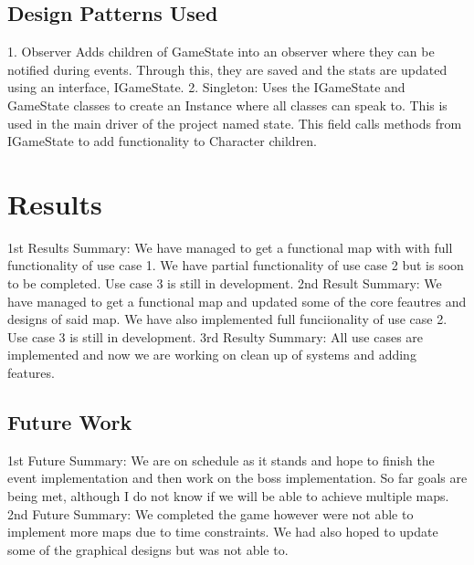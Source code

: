 \documentclass[10pt,conference,onecolumn,compsoc]{IEEEtran}
\begin{document}
\subsection{Design Patterns Used}
1. Observer Adds children of GameState into an observer where they can be notified during events. Through this, they are saved and the stats are updated using an interface, IGameState.
2. Singleton: Uses the IGameState and GameState classes to create an Instance where all classes can speak to. This is used in the main driver of the project named state. This field calls methods from IGameState to add functionality to Character children.



\section{Results}
1st Results Summary: We have managed to get a functional map with with full functionality of use case 1. We have partial functionality of use case 2 but is soon to be completed. Use case 3 is still in development. 
2nd Result Summary: We have managed to get a functional map and updated some of the core feautres and designs of said map. We have also implemented full funciionality of use case 2. Use case 3 is still in development.
3rd Resulty Summary: All use cases are implemented and now we are working on clean up of systems and adding features.

\subsection{Future Work}
1st Future Summary: We are on schedule as it stands and hope to finish the event implementation and then work on the boss implementation. So far goals are being met, although I do not know if we will be able to achieve multiple maps.
2nd Future Summary: We completed the game however were not able to implement more maps due to time constraints. We had also hoped to update some of the graphical designs but was not able to.




\end{document}
